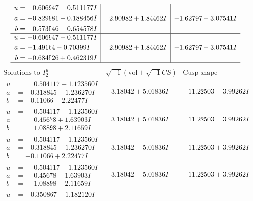 \documentclass[1p]{elsarticle_modified}
\theoremstyle{definition}
\newcommand{\I}{\sqrt{-1}}
\begin{document}
$$\begin{array}{c|c|c}
\begin{aligned}
u &= -0.606947 - 0.511177 I \\
a &= -0.829981 - 0.188456 I \\
b &= -0.573546 - 0.654578 I\end{aligned}
 & \phantom{-}2.90982 + 1.84462 I & -1.62797 - 3.07541 I \\ \hline\begin{aligned}
u &= -0.606947 - 0.511177 I \\
a &= -1.49164 - 0.70399 I \\
b &= -0.684526 + 0.462319 I\end{aligned}
 & \phantom{-}2.90982 + 1.84462 I & -1.62797 - 3.07541 I\\
 \hline 
 \end{array}$$\newpage$$\begin{array}{c|c|c}  
\text{Solutions to }I^u_{2}& \I (\text{vol} + \sqrt{-1}CS) & \text{Cusp shape}\\
 \hline 
\begin{aligned}
u &= \phantom{-}0.504117 + 1.123560 I \\
a &= -0.318845 - 1.236270 I \\
b &= -0.11066 - 2.22477 I\end{aligned}
 & -3.18042 + 5.01836 I & -11.22503 - 3.99262 I \\ \hline\begin{aligned}
u &= \phantom{-}0.504117 + 1.123560 I \\
a &= \phantom{-}0.45678 + 1.63903 I \\
b &= \phantom{-}1.08898 + 2.11659 I\end{aligned}
 & -3.18042 + 5.01836 I & -11.22503 - 3.99262 I \\ \hline\begin{aligned}
u &= \phantom{-}0.504117 - 1.123560 I \\
a &= -0.318845 + 1.236270 I \\
b &= -0.11066 + 2.22477 I\end{aligned}
 & -3.18042 - 5.01836 I & -11.22503 + 3.99262 I \\ \hline\begin{aligned}
u &= \phantom{-}0.504117 - 1.123560 I \\
a &= \phantom{-}0.45678 - 1.63903 I \\
b &= \phantom{-}1.08898 - 2.11659 I\end{aligned}
 & -3.18042 - 5.01836 I & -11.22503 + 3.99262 I \\ \hline\begin{aligned}
u &= -0.350867 + 1.182120 I \\

\end{aligned}
\end{array}$$
\end{document}
